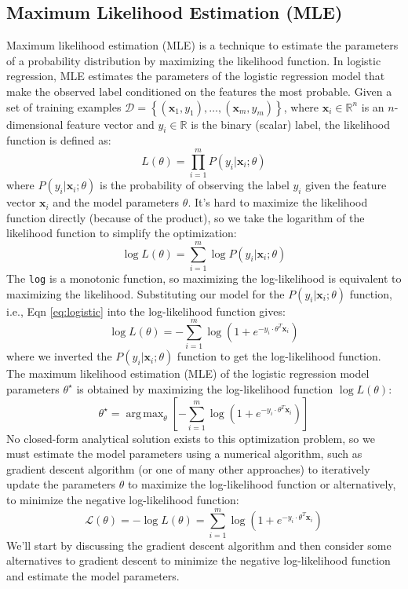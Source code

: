 \documentclass{article}[12pt]
\DeclareMathOperator*{\argmax}{arg\,max}
\begin{document}
\subsection{Maximum Likelihood Estimation (MLE)}
Maximum likelihood estimation (MLE) is a technique to estimate the parameters of a probability distribution by maximizing the likelihood function.
In logistic regression, MLE estimates the parameters of the logistic regression model that make the observed label conditioned on the features the most probable.
Given a set of training examples $\mathcal{D} = \left\{\left(\mathbf{x}_{1}, y_{1}\right),\dots,\left(\mathbf{x}_{m}, y_{m}\right)\right\}$, where $\mathbf{x}_{i}\in\mathbb{R}^{n}$ is an $n$-dimensional feature vector and $y_{i}\in\mathbb{R}$ is the binary (scalar) label, the likelihood function is defined as:
\begin{equation}
L(\theta) = \prod_{i=1}^{m}P(y_{i}|\mathbf{x}_{i};\theta)
\end{equation}
where $P(y_{i}|\mathbf{x}_{i};\theta)$ is the probability of observing the label $y_{i}$ given the feature vector $\mathbf{x}_{i}$ and the model parameters $\theta$.
It's hard to maximize the likelihood function directly (because of the product), so we take the logarithm of the likelihood function to simplify the optimization:
\begin{equation}
\log{L}(\theta) = \sum_{i=1}^{m}\log P(y_{i}|\mathbf{x}_{i};\theta)
\end{equation}
The \texttt{log} is a monotonic function, so maximizing the log-likelihood is equivalent to maximizing the likelihood.
Substituting our model for the $P(y_{i}|\mathbf{x}_{i};\theta)$ function, i.e., Eqn \eqref{eq:logistic} into the log-likelihood function gives:
\begin{equation}
\log{L}(\theta) = -\sum_{i=1}^{m}\log\left(1 + e^{-y_{i}\cdot\theta^{T}\mathbf{x}_{i}}\right)
\end{equation}
where we inverted the $P(y_{i}|\mathbf{x}_{i};\theta)$ function to get the log-likelihood function.
The maximum likelihood estimation (MLE) of the logistic regression model parameters $\theta^{\star}$ is obtained by maximizing the log-likelihood function
$\log{L}(\theta)$:
\begin{equation}
\theta^{\star} = \argmax_{\theta}\left[-\sum_{i=1}^{m}\log\left(1 + e^{-y_{i}\cdot\theta^{T}\mathbf{x}_{i}}\right)\right]
\end{equation}
No closed-form analytical solution exists to this optimization problem, so we must estimate the model parameters using a numerical algorithm, 
such as gradient descent algorithm (or one of many other approaches) to iteratively update the parameters $\theta$ to maximize the log-likelihood function 
or alternatively, to minimize the negative log-likelihood function:
\begin{equation}
\mathcal{L}(\theta) =-\log{L}(\theta) = \sum_{i=1}^{m}\log\left(1 + e^{-y_{i}\cdot\theta^{T}\mathbf{x}_{i}}\right)
\end{equation}
We'll start by discussing the gradient descent algorithm and then consider some alternatives to gradient descent to 
minimize the negative log-likelihood function and estimate the model parameters.
\end{document}
